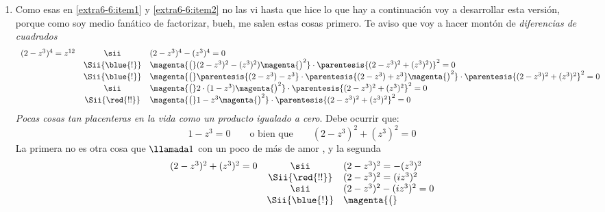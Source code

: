 \begin{enumerate}[label=\magic$_{\arabic*}$)]
  \item\label{extra6-6:item3} Como esas en \ref{extra6-6:item1} y \ref{extra6-6:item2} no las vi hasta que hice lo que hay
        a continuación voy a desarrollar esta versión, porque como soy medio fanático de factorizar,
        bueh, me salen estas cosas primero.
        Te aviso que voy a hacer montón de \textit{diferencias de cuadrados\blue{!}}
        $$
          \begin{array}{rcl}
            (2-z^3)^4 = z^{12}
             & \sii           &
            (2-z^3)^4 - (z^3)^4 = 0 \\
             & \Sii{\blue{!}} &
            \magenta{\big(}
            (2-z^3)^2 - (z^3)^2 )
            \magenta{\big)^2}
            \cdot
            \parentesis{(2-z^3)^2 + (z^3)^2)}^2
            = 0                     \\
             & \Sii{\blue{!}} &
            \magenta{\big(}\parentesis{(2-z^3) - z^3}
            \cdot
            \parentesis{(2-z^3) + z^3}
            \magenta{\big)^2}
            \cdot
            \parentesis{(2-z^3)^2 + (z^3)^2}^2
            = 0                     \\
             & \sii           &
            \magenta{\big(}
            2 \cdot (1-z^3)
            \magenta{\big)^2}
            \cdot
            \parentesis{(2-z^3)^2 + (z^3)^2}^2
            = 0                     \\
             & \Sii{\red{!!}} &
            \magenta{\big(}
            1 - z^3
            \magenta{\big)^2}
            \cdot
            \parentesis{(2-z^3)^2 + (z^3)^2}^2
            = 0
          \end{array}
        $$
        \textit{Pocas cosas tan placenteras en la vida como un producto igualado a cero}. Debe ocurrir que:
        $$
          1 - z^3 = 0
          \qquad \text{o bien que} \qquad
          (2-z^3)^2 + (z^3)^2 = 0
        $$
        La primera no es otra cosa que $\llamada1$ con un poco de más de amor {\tiny{}},
        y la segunda
        $$
          \begin{array}{rcl}
            (2-z^3)^2 + (z^3)^2 = 0
             & \sii           &
            (2 - z^3)^2  = - (z^3)^2    \\
             & \Sii{\red{!!}} &
            (2 - z^3)^2  = (iz^3)^2     \\
             & \sii           &
            (2 - z^3)^2  - (iz^3)^2 = 0 \\
             & \Sii{\blue{!}} &
            \magenta{\big(}

\end{array}$$
\end{enumerate}
